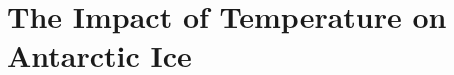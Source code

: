 \documentclass[../main.tex]{subfiles}
\begin{document}
\chapter{The Impact of Temperature on Antarctic Ice}
\end{document}
